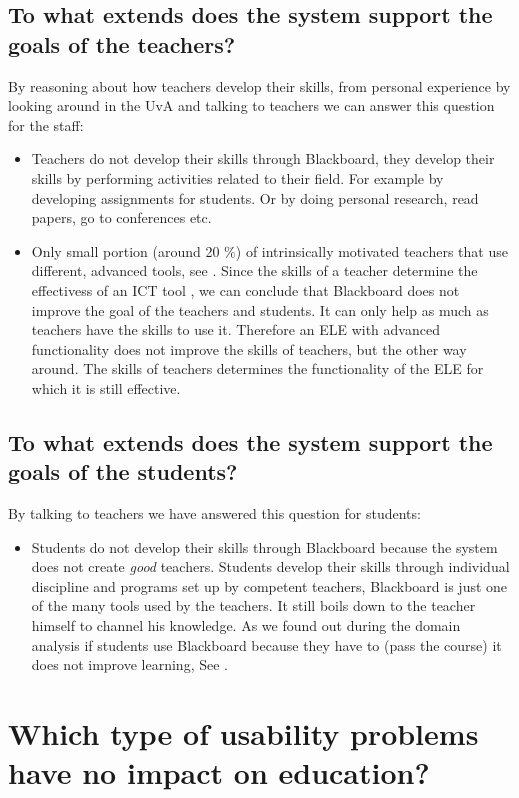 \subsection{To what extends does the system support the goals of the teachers?}
By reasoning about how teachers develop their skills, from personal experience by looking around in the UvA and talking to teachers we can answer this question for the staff:
\begin{itemize}
	\item Teachers do not develop their skills through Blackboard, they develop their skills by performing activities related to their field. For example by developing assignments for students. Or by doing personal research, read papers, go to conferences etc.
	\item Only small portion (around 20 $\%$) of intrinsically motivated teachers that use different, advanced tools, see \cite{richard_report}. Since the skills of a teacher determine the effectivess of an ICT tool , we can conclude that Blackboard does not improve the goal of the teachers and students. It can only help as much as teachers have the skills to use it. Therefore an ELE with advanced functionality does not improve the skills of teachers, but the other way around. The skills of teachers determines the functionality of the ELE for which it is still effective. 
\end{itemize}

\subsection{To what extends does the system support the goals of the students?}
By talking to teachers we have answered this question for students:
\begin{itemize}
	\item Students do not develop their skills through Blackboard because the system does not create \emph{good} teachers. Students develop their skills through individual discipline and programs set up by competent teachers, Blackboard is just one of the many tools used by the teachers. It still boils down to the teacher himself to channel his knowledge. As we found out during the domain analysis if students use Blackboard because they have to (pass the course) it does not improve learning, See .
\end{itemize}

\section{Which type of usability problems have no impact on education?}\label{s_1}
